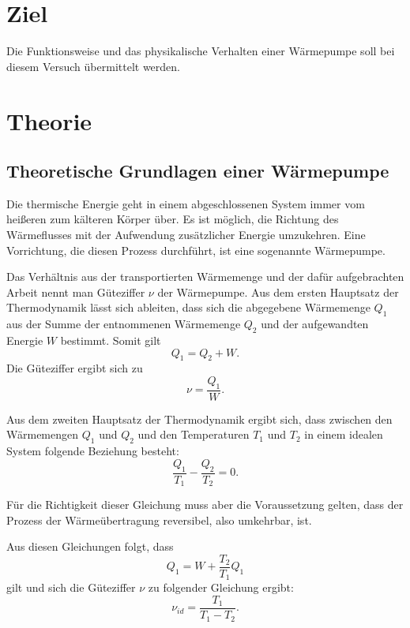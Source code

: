 \section{Ziel}
\label{sec:Ziel}

Die Funktionsweise und das physikalische Verhalten einer Wärmepumpe soll bei diesem 
Versuch übermittelt werden.

\section{Theorie}
\label{sec:Theorie}

\subsection{Theoretische Grundlagen einer Wärmepumpe}
Die thermische Energie geht in einem abgeschlossenen System immer vom heißeren zum 
kälteren Körper über. Es ist möglich, die Richtung des Wärmeflusses mit der Aufwendung 
zusätzlicher Energie umzukehren. Eine Vorrichtung, die diesen Prozess durchführt, ist 
eine sogenannte Wärmepumpe. 

\noindent Das Verhältnis aus der transportierten Wärmemenge und der dafür aufgebrachten 
Arbeit nennt man Güteziffer $\nu$ der Wärmepumpe. Aus dem ersten Hauptsatz der 
Thermodynamik lässt sich ableiten, dass sich die abgegebene Wärmemenge $Q_1$ aus der 
Summe der entnommenen Wärmemenge $Q_2$ und der aufgewandten Energie $W$ bestimmt. 
Somit gilt
\begin{equation*}
    Q_1 = Q_2 + W.
\end{equation*} 
Die Güteziffer ergibt sich zu 
\begin{equation*}
    \nu = \frac{Q_1}{W}.
\end{equation*}

\noindent Aus dem zweiten Hauptsatz der Thermodynamik ergibt sich, dass zwischen den Wärmemengen 
$Q_1$ und $Q_2$ und den Temperaturen $T_1$ und $T_2$ in einem idealen System folgende 
Beziehung besteht:
\begin{equation*}
    \frac{Q_1}{T_1} - \frac{Q_2}{T_2} = 0.
\end{equation*}

\noindent Für die Richtigkeit dieser Gleichung muss aber die Voraussetzung gelten, dass der 
Prozess der Wärmeübertragung reversibel, also umkehrbar, ist. 

\noindent Aus diesen Gleichungen folgt, dass 
\begin{equation*}
    Q_1 = W+ \frac{T_2}{T_1} Q_1 
\end{equation*}
gilt und sich die Güteziffer $\nu$ zu folgender Gleichung ergibt: 
\begin{equation}
    \nu_{id}= \frac{T_1}{T_1-T_2}.
    \label{eqn:ideal}
\end{equation} 

